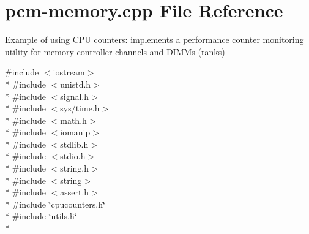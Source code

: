 \section{pcm-\/memory.cpp File Reference}
\label{pcm-memory_8cpp}


Example of using C\+PU counters\+: implements a performance counter monitoring utility for memory controller channels and D\+I\+M\+Ms (ranks)  


{\ttfamily \#include $<$iostream$>$}\\*
{\ttfamily \#include $<$unistd.\+h$>$}\\*
{\ttfamily \#include $<$signal.\+h$>$}\\*
{\ttfamily \#include $<$sys/time.\+h$>$}\\*
{\ttfamily \#include $<$math.\+h$>$}\\*
{\ttfamily \#include $<$iomanip$>$}\\*
{\ttfamily \#include $<$stdlib.\+h$>$}\\*
{\ttfamily \#include $<$stdio.\+h$>$}\\*
{\ttfamily \#include $<$string.\+h$>$}\\*
{\ttfamily \#include $<$string$>$}\\*
{\ttfamily \#include $<$assert.\+h$>$}\\*
{\ttfamily \#include \char`\"{}cpucounters.\+h\char`\"{}}\\*
{\ttfamily \#include \char`\"{}utils.\+h\char`\"{}}\\*
